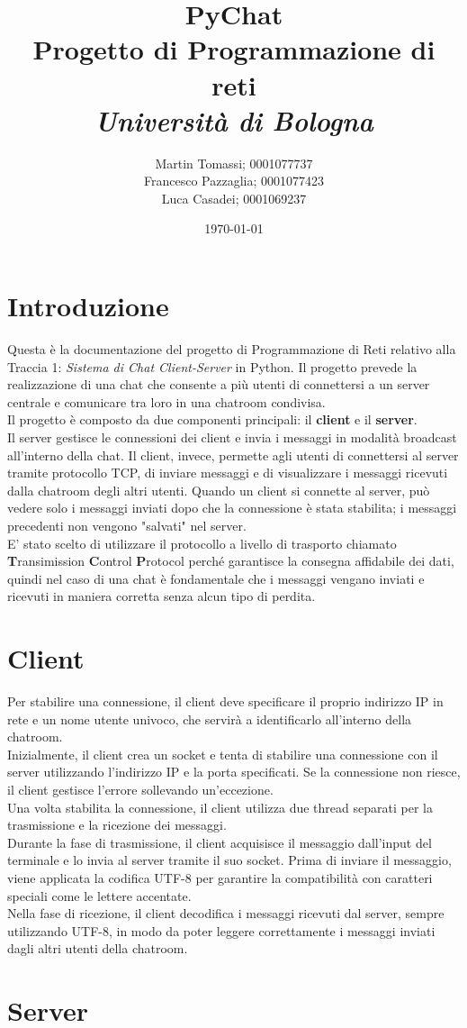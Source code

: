 \documentclass[a4paper,12pt]{report}
\title{\textbf{PyChat}\\Progetto di Programmazione di reti\\\textit{Università di Bologna}}
\author{Martin Tomassi; 0001077737\\Francesco Pazzaglia; 0001077423\\Luca Casadei; 0001069237}
\date{\today}
\begin{document}
\maketitle
\tableofcontents

\chapter{Introduzione}
Questa è la documentazione del progetto di Programmazione di Reti relativo alla Traccia 1: \textit{Sistema di Chat Client-Server} in Python. Il progetto prevede la realizzazione di una chat che consente a più utenti di connettersi a un server centrale e comunicare tra loro in una chatroom condivisa.\\
Il progetto è composto da due componenti principali: il \textbf{client} e il \textbf{server}.\\
Il server gestisce le connessioni dei client e invia i messaggi in modalità broadcast all'interno della chat. Il client, invece, permette agli utenti di connettersi al server tramite protocollo TCP, di inviare messaggi e di visualizzare i messaggi ricevuti dalla chatroom degli altri utenti. Quando un client si connette al server, può vedere solo i messaggi inviati dopo che la connessione è stata stabilita; i messaggi precedenti non vengono "salvati" nel server. \\
E' stato scelto di utilizzare il protocollo a livello di trasporto chiamato \textbf{T}ransimission \textbf{C}ontrol \textbf{P}rotocol perché garantisce la consegna affidabile dei dati, quindi nel caso di una chat è fondamentale che i messaggi vengano inviati e ricevuti in maniera corretta senza alcun tipo di perdita.

\chapter{Client}
Per stabilire una connessione, il client deve specificare il proprio indirizzo IP in rete e un nome utente univoco, che servirà a identificarlo all'interno della chatroom.
\\
Inizialmente, il client crea un socket e tenta di stabilire una connessione con il server utilizzando l'indirizzo IP e la porta specificati. Se la connessione non riesce, il client gestisce l'errore sollevando un'eccezione.
\\
Una volta stabilita la connessione, il client utilizza due thread separati per la trasmissione e la ricezione dei messaggi.
\\
Durante la fase di trasmissione, il client acquisisce il messaggio dall'input del terminale e lo invia al server tramite il suo socket. Prima di inviare il messaggio, viene applicata la codifica UTF-8 per garantire la compatibilità con caratteri speciali come le lettere accentate.
\\
Nella fase di ricezione, il client decodifica i messaggi ricevuti dal server, sempre utilizzando UTF-8, in modo da poter leggere correttamente i messaggi inviati dagli altri utenti della chatroom.

\chapter{Server}
\end{document}
